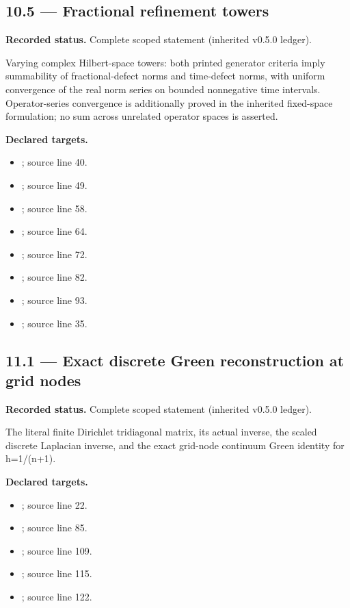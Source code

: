 \subsection{10.5 — Fractional refinement towers}
\label{result:10.5}
\textbf{Recorded status.} Complete scoped statement (inherited v0.5.0 ledger).\par
Varying complex Hilbert-space towers: both printed generator criteria imply summability of fractional-defect norms and time-defect norms, with uniform convergence of the real norm series on bounded nonnegative time intervals. Operator-series convergence is additionally proved in the inherited fixed-space formulation; no sum across unrelated operator spaces is asserted.

\textbf{Declared targets.}\begin{itemize}
\item {}; source line 40.
\item {}; source line 49.
\item {}; source line 58.
\item {}; source line 64.
\item {}; source line 72.
\item {}; source line 82.
\item {}; source line 93.
\item {}; source line 35.
\end{itemize}
\subsection{11.1 — Exact discrete Green reconstruction at grid nodes}
\label{result:11.1}
\textbf{Recorded status.} Complete scoped statement (inherited v0.5.0 ledger).\par
The literal finite Dirichlet tridiagonal matrix, its actual inverse, the scaled discrete Laplacian inverse, and the exact grid-node continuum Green identity for h=1/(n+1).

\textbf{Declared targets.}\begin{itemize}
\item {}; source line 22.
\item {}; source line 85.
\item {}; source line 109.
\item {}; source line 115.
\item {}; source line 122.
\end{itemize}
